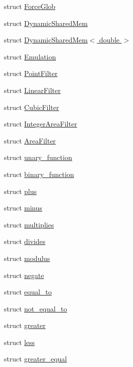\begin{DoxyCompactItemize}
struct \hyperlink{structcv_1_1gpu_1_1device_1_1ForceGlob}{Force\-Glob}
\item 
struct \hyperlink{structcv_1_1gpu_1_1device_1_1DynamicSharedMem}{Dynamic\-Shared\-Mem}
\item 
struct \hyperlink{structcv_1_1gpu_1_1device_1_1DynamicSharedMem_3_01double_01_4}{Dynamic\-Shared\-Mem$<$ double $>$}
\item 
struct \hyperlink{structcv_1_1gpu_1_1device_1_1Emulation}{Emulation}
\item 
struct \hyperlink{structcv_1_1gpu_1_1device_1_1PointFilter}{Point\-Filter}
\item 
struct \hyperlink{structcv_1_1gpu_1_1device_1_1LinearFilter}{Linear\-Filter}
\item 
struct \hyperlink{structcv_1_1gpu_1_1device_1_1CubicFilter}{Cubic\-Filter}
\item 
struct \hyperlink{structcv_1_1gpu_1_1device_1_1IntegerAreaFilter}{Integer\-Area\-Filter}
\item 
struct \hyperlink{structcv_1_1gpu_1_1device_1_1AreaFilter}{Area\-Filter}
\item 
struct \hyperlink{structcv_1_1gpu_1_1device_1_1unary__function}{unary\-\_\-function}
\item 
struct \hyperlink{structcv_1_1gpu_1_1device_1_1binary__function}{binary\-\_\-function}
\item 
struct \hyperlink{structcv_1_1gpu_1_1device_1_1plus}{plus}
\item 
struct \hyperlink{structcv_1_1gpu_1_1device_1_1minus}{minus}
\item 
struct \hyperlink{structcv_1_1gpu_1_1device_1_1multiplies}{multiplies}
\item 
struct \hyperlink{structcv_1_1gpu_1_1device_1_1divides}{divides}
\item 
struct \hyperlink{structcv_1_1gpu_1_1device_1_1modulus}{modulus}
\item 
struct \hyperlink{structcv_1_1gpu_1_1device_1_1negate}{negate}
\item 
struct \hyperlink{structcv_1_1gpu_1_1device_1_1equal__to}{equal\-\_\-to}
\item 
struct \hyperlink{structcv_1_1gpu_1_1device_1_1not__equal__to}{not\-\_\-equal\-\_\-to}
\item 
struct \hyperlink{structcv_1_1gpu_1_1device_1_1greater}{greater}
\item 
struct \hyperlink{structcv_1_1gpu_1_1device_1_1less}{less}
\item 
struct \hyperlink{structcv_1_1gpu_1_1device_1_1greater__equal}{greater\-\_\-equal}

\end{DoxyCompactItemize}

